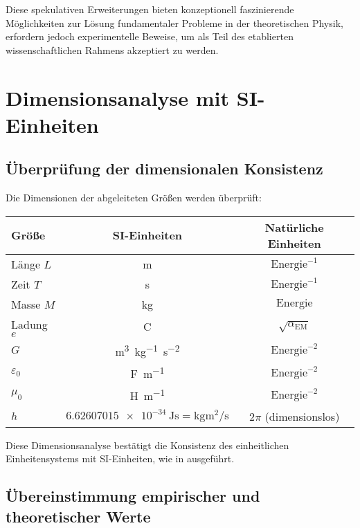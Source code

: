 \documentclass[12pt,a4paper]{article}
\newcommand{\alphaEM}{\alpha_{\text{EM}}}
\begin{document}
	Diese spekulativen Erweiterungen bieten konzeptionell faszinierende Möglichkeiten zur Lösung fundamentaler Probleme in der theoretischen Physik, erfordern jedoch experimentelle Beweise, um als Teil des etablierten wissenschaftlichen Rahmens akzeptiert zu werden.
	
	\section{Dimensionsanalyse mit SI-Einheiten}
	\label{sec:dimensional_analysis}
	
	\subsection{Überprüfung der dimensionalen Konsistenz}
	\label{subsec:dimensional_consistency}
	
	Die Dimensionen der abgeleiteten Größen werden überprüft:
	
	\begin{center}
		\begin{tabular}{lcc}
			\toprule
			\textbf{Größe} & \textbf{SI-Einheiten} & \textbf{Natürliche Einheiten} \\
			\midrule
			Länge \(L\) & \si{\meter} & \(\text{Energie}^{-1}\) \\
			Zeit \(T\) & \si{\second} & \(\text{Energie}^{-1}\) \\
			Masse \(M\) & \si{\kilo\gram} & \(\text{Energie}\) \\
			Ladung \(e\) & \si{\coulomb} & \(\sqrt{\alphaEM}\) \\
			\(G\) & \si{\meter^3\kilo\gram^{-1}\second^{-2}} & \(\text{Energie}^{-2}\) \\
			\(\varepsilon_0\) & \si{\farad\per\meter} & \(\text{Energie}^{-2}\) \\
			\(\mu_0\) & \si{\henry\per\meter} & \(\text{Energie}^{-2}\) \\
			\(h\) & \(\SI{6.62607015e-34}{\joule\second} = \si{\kilo\gram \meter\squared\per\second}\) & \(2\pi\) (dimensionslos) \\
			\bottomrule
		\end{tabular}
	\end{center}
	
	Diese Dimensionsanalyse bestätigt die Konsistenz des einheitlichen Einheitensystems mit SI-Einheiten, wie in \cite{pascher_alphabeta_2025} ausgeführt.
	
	\subsection{Übereinstimmung empirischer und theoretischer Werte}
	\label{subsec:empirical_theoretical}
	
\end{document}
